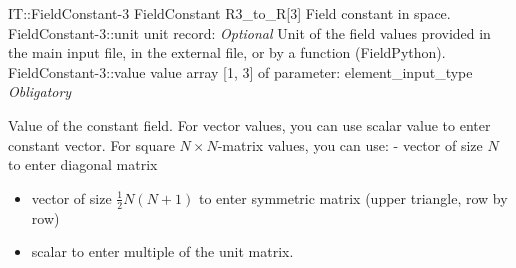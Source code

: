 \begin{RecordType}
	{IT::FieldConstant-3}
	{FieldConstant}
	{}%
	{}%
	{{{R3{\_}to{\_}R[3] Field constant in space.}%
}}
		\RecKey
			{FieldConstant-3::unit}
			{unit}
			{{record: }}{}
			{ \it{Optional}}
			{{{Unit of the field values provided in the main input file, in the external file, or by a function (FieldPython).}%
}}
		\RecKey
			{FieldConstant-3::value}
			{value}
			{{array [1, 3] of }{parameter: element{\_}input{\_}type}}{}
			{ \it{Obligatory}}
			{{{{Value of the constant field.
For vector values, you can use scalar value to enter constant vector.
For square }{$N\times N$}{-matrix values, you can use:  - vector of size }{$N$}{ to enter diagonal matrix}
% 
}
\begin{itemize}
\item {vector of size }{$\frac12N(N+1)$}{ to enter symmetric matrix (upper triangle, row by row)}
\item {scalar to enter multiple of the unit matrix.}
\end{itemize}
}}
\end{RecordType}

